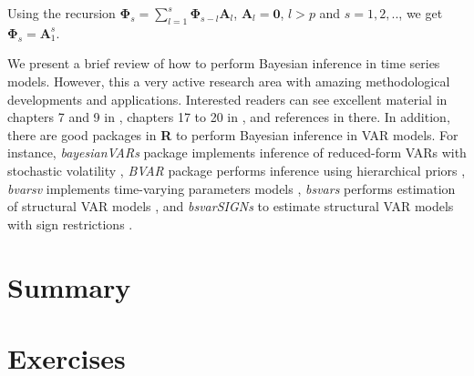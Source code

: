 Using the recursion $\bm{\Phi}_s=\sum_{l=1}^s\bm{\Phi}_{s-l}\bm{A}_l$, $\bm{A}_l=\bm{0}$, $l>p$ and $s=1,2,..$, we get $\bm{\Phi}_s = \bm{A}_1^s$. 

We present a brief review of how to perform Bayesian inference in time series models. However, this a very active research area with amazing methodological developments and applications. Interested readers can see excellent material in chapters 7 and 9 in \cite{geweke2011oxford}, chapters 17 to 20 in \cite{chan2019bayesian}, and references in there. In addition, there are good packages in \textbf{R} to perform Bayesian inference in VAR models. For instance, \textit{bayesianVARs} package implements inference of reduced-form VARs with stochastic volatility \cite{Gruber2024}, \textit{BVAR} package performs inference using hierarchical priors \cite{Kuschnig2024}, \textit{bvarsv} implements time-varying parameters models \cite{Krueger2022}, \textit{bsvars} performs estimation of structural VAR models \cite{Tomasz2024}, and \textit{bsvarSIGNs} to estimate structural VAR models with sign restrictions \cite{Wang2024}. 
      
 
\section{Summary}\label{sec85}

\section{Exercises}\label{sec86}

